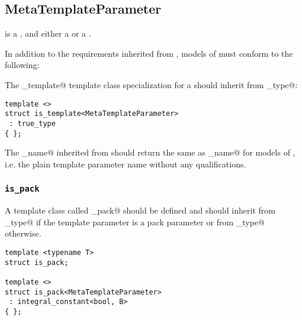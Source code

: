 \subsection{MetaTemplateParameter}
\label{concept-MetaTemplateParameter}

 is a , 
and either a  or a .

In addition to the requirements inherited from ,
models of  must conform to the following:

The \verb@is_template@ template class specialization for a  should
inherit from \verb@true_type@:

\begin{verbatim}
template <>
struct is_template<MetaTemplateParameter>
 : true_type
{ };
\end{verbatim}

The \verb@full_name@ inherited from  should return the same 
as \verb@base_name@ for models of , i.e. the plain template parameter
name without any qualifications.

\subsubsection{\texttt{is\_pack}}

A template class called \verb@is_pack@ should be defined and should
inherit from \verb@true_type@ if the template parameter is a pack
parameter or from \verb@false_type@ otherwise.

\begin{verbatim}
template <typename T>
struct is_pack;

template <>
struct is_pack<MetaTemplateParameter>
 : integral_constant<bool, B>
{ };
\end{verbatim}


